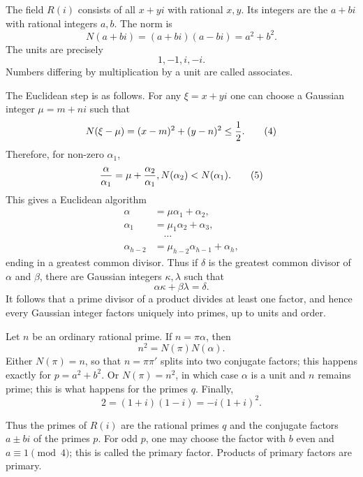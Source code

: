 \documentclass[11pt]{article}
\begin{document}
The field $R(i)$ consists of all $x+yi$ with rational $x,y$. Its integers are the $a+bi$ with rational integers $a,b$. The norm is
\[
        N(a+bi)=(a+bi)(a-bi)=a^2+b^2.                                  \tag{2}
\]
The units are precisely
\[
        1,
        -1,
        i,
        -i.                                                            \tag{3}
\]
Numbers differing by multiplication by a unit are called associates.

The Euclidean step is as follows. For any $\xi=x+yi$ one can choose a Gaussian integer $\mu=m+ni$ such that
\[
        N(\xi-
\mu)=(x-m)^2+(y-n)^2\le {1\over2}.                         \tag{4}
\]
Therefore, for non-zero $\alpha_1$,
\[
        {\alpha\over\alpha_1}=\mu+{\alpha_2\over\alpha_1},
        N(\alpha_2)<N(\alpha_1).                                      \tag{5}
\]
This gives a Euclidean algorithm
\[
\begin{aligned}
\alpha&=\mu\alpha_1+
\alpha_2,\\
\alpha_1&=\mu_1\alpha_2+
\alpha_3,\\
&\hspace{1em}\cdots\\
\alpha_{h-2}&=\mu_{h-2}\alpha_{h-1}+
\alpha_h,
\end{aligned}                                                          \tag{6}
\]
ending in a greatest common divisor. Thus if $\delta$ is the greatest common divisor of $\alpha$ and $\beta$, there are Gaussian integers $\kappa,
\lambda$ such that
\[
        \alpha\kappa+
\beta\lambda=\delta.                              \tag{7}
\]
It follows that a prime divisor of a product divides at least one factor, and hence every Gaussian integer factors uniquely into primes, up to units and order.

Let $n$ be an ordinary rational prime. If $n=\pi\alpha$, then
\[
        n^2=N(\pi)N(\alpha).                                           \tag{8}
\]
Either $N(\pi)=n$, so that $n=\pi\pi'$ splits into two conjugate factors; this happens exactly for $p=a^2+b^2$. Or $N(\pi)=n^2$, in which case $\alpha$ is a unit and $n$ remains prime; this is what happens for the primes $q$. Finally,
\[
        2=(1+i)(1-i)=-i(1+i)^2.                                        \tag{9}
\]

Thus the primes of $R(i)$ are the rational primes $q$ and the conjugate factors $a\pm bi$ of the primes $p$. For odd $p$, one may choose the factor with $b$ even and $a\equiv1\pmod4$; this is called the primary factor. Products of primary factors are primary.
\end{document}
